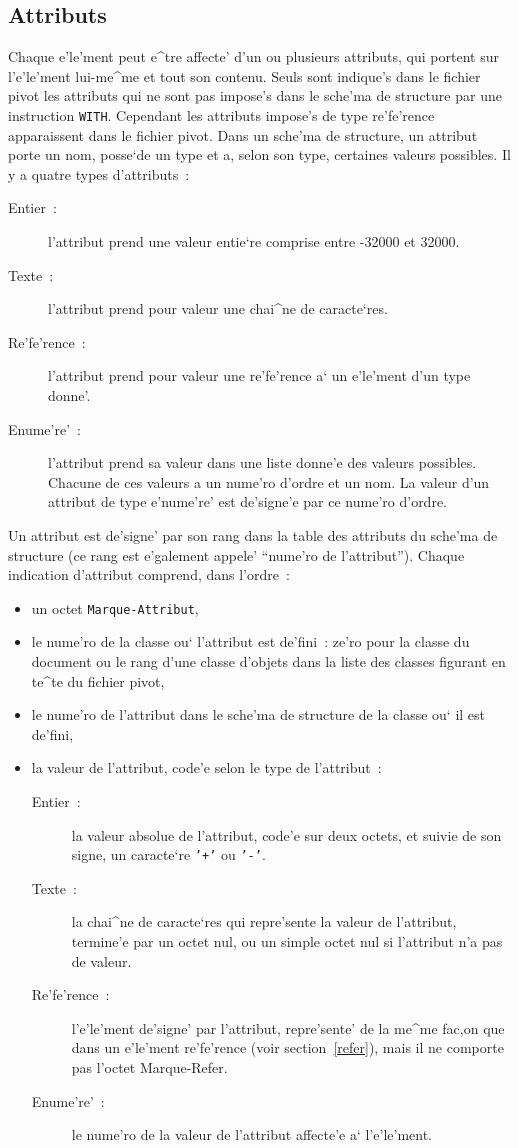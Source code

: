 \subsection{Attributs}

Chaque e'le'ment peut e^tre affecte' d'un ou plusieurs attributs, qui portent sur
l'e'le'ment lui-me^me et tout son contenu. Seuls sont indique's dans le fichier
pivot les attributs qui ne sont pas impose's dans le sche'ma de structure par
une instruction {\tt WITH}. Cependant les attributs impose's de type re'fe'rence
apparaissent dans le fichier pivot. Dans un sche'ma de structure, un attribut
porte un nom, posse`de un type et a, selon son type, certaines valeurs
possibles. Il y a quatre types d'attributs~:
\begin{description}
\item[Entier~:]
l'attribut prend une valeur entie`re comprise entre -32000 et 32000.
\item[Texte~:]
l'attribut prend pour valeur une chai^ne de caracte`res.
\item[Re'fe'rence~:]
l'attribut prend pour valeur une re'fe'rence a` un e'le'ment d'un type donne'.
\item[Enume're'~:]
l'attribut prend sa valeur dans une liste donne'e des valeurs possibles.
Chacune de ces valeurs a un nume'ro d'ordre et un nom. La valeur d'un attribut
de type e'nume're' est de'signe'e par ce nume'ro d'ordre.
\end{description}

Un attribut est de'signe' par son rang dans la table des attributs du sche'ma
de structure (ce rang est e'galement appele' ``nume'ro de l'attribut''). Chaque
indication d'attribut comprend, dans l'ordre~:

\begin{itemize}
\item
un octet {\tt Marque-Attribut},
\item
le nume'ro de la classe ou` l'attribut est de'fini~: ze'ro pour la classe du
document ou le rang d'une classe d'objets dans la liste des classes figurant
en te^te du fichier pivot,
\item
le nume'ro de l'attribut dans le sche'ma de structure de la classe ou` il est
de'fini,
\item
la valeur de l'attribut, code'e selon le type de l'attribut~:
   \begin{description}
   \item[Entier~:]
   la valeur absolue de l'attribut, code'e sur deux octets, et suivie de son
   signe, un caracte`re {\tt '+'} ou {\tt '-'}.
   \item[Texte~:]
   la chai^ne de caracte`res qui repre'sente la valeur de l'attribut, termine'e
   par un octet nul, ou un simple octet nul si l'attribut n'a pas de valeur.
   \item[Re'fe'rence~:]
   l'e'le'ment de'signe' par l'attribut, repre'sente' de la me^me
   fac,on que dans un e'le'ment re'fe'rence (voir section~\ref{refer}),
   mais il ne comporte pas l'octet Marque-Refer.
   \item[Enume're'~:]
   le nume'ro de la valeur de l'attribut affecte'e a` l'e'le'ment.
   \end{description}
\end{itemize}

